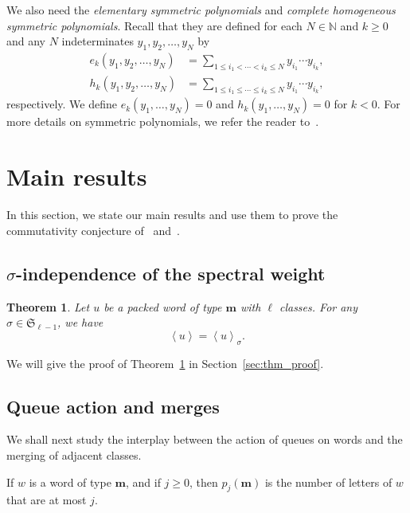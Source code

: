 \documentclass[reqno]{amsart}
\newcommand{\0}{\phantom{c}}
\newcommand{\swt}[1]{\left\langle #1 \right\rangle} %
\newcommand{\SymGp}[1]{\mathfrak{S}_{#1}} %
\newcommand{\mm}{\mathbf{m}}
\newcommand{\NN}{\mathbb{N}}
\let\sumnonlimits\sum
\renewcommand{\sum}{\sumnonlimits\limits}
\newcommand{\defn}[1]{{\color{darkred}\emph{#1}}} %
\theoremstyle{plain}
\newtheorem{thm}{Theorem}[section]
\theoremstyle{definition}
\numberwithin{equation}{section}
\begin{document}
We also need the \defn{elementary symmetric polynomials} and \defn{complete homogeneous symmetric polynomials}.
Recall that they are defined for each $N \in \NN$ and $k \geq 0$ and any $N$ indeterminates $y_1, y_2, \ldots, y_N$ by
\begin{align*}
e_k(y_1, y_2, \dotsc, y_N) & = \sum_{1 \leq i_1 < \cdots < i_k \leq N} y_{i_1} \dotsm y_{i_k},
\\ h_k(y_1, y_2, \dotsc, y_N) & = \sum_{1 \leq i_1 \leq \cdots \leq i_k \leq N} y_{i_1} \dotsm y_{i_k},
\end{align*}
respectively.
We define $e_k(y_1, \dotsc, y_N) = 0$ and $h_k(y_1, \dotsc, y_N) = 0$ for $k < 0$.
For more details on symmetric polynomials, we refer the reader to~\cite[Ch.~7]{Stanley-EC2}.








\section{Main results}
\label{sec:result}


In this section, we state our main results and use them to prove the commutativity conjecture of~\cite{AAMP} and~\cite[Conj.~3.10]{AasLin17}.

\subsection{$\sigma$-independence of the spectral weight}

\begin{thm}
\label{thm:permutation}
  Let $u$ be a packed word of type $\mm$ with $\ell$ classes.
  For any $\sigma \in \SymGp{\ell-1}$, we have 
  \[
  \swt{u} = \swt{u}_{\sigma}.
  \]
\end{thm}

We will give the proof of Theorem~\ref{thm:permutation} in Section~\ref{sec:thm_proof}.

\subsection{Queue action and merges}
We shall next study the interplay between the action of queues on words and the merging of adjacent classes.

If $w$ is a word of type $\mm$, and if $j \geq 0$, then $p_j(\mm)$ is the number of letters of $w$ that are at most $j$.
\end{document}
